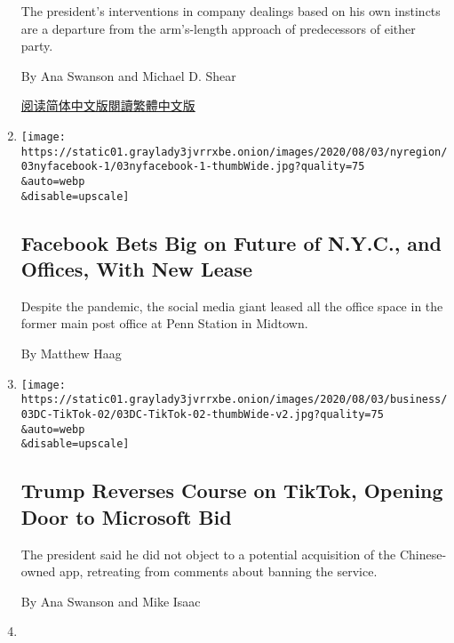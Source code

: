 \begin{enumerate}
  The president's interventions in company dealings based on his own
  instincts are a departure from the arm's-length approach of
  predecessors of either party.

  By Ana Swanson and Michael D. Shear

  \href{https://cn.nytimes3xbfgragh.onion/business/20200804/trump-tiktok-china-business/}{阅读简体中文版}\href{https://cn.nytimes3xbfgragh.onion/business/20200804/trump-tiktok-china-business/zh-hant/}{閱讀繁體中文版}
\item
  \href{/2020/08/03/nyregion/facebook-nyc-office-farley-building.html}{}

  \texttt{[image: https://static01.graylady3jvrrxbe.onion/images/2020/08/03/nyregion/03nyfacebook-1/03nyfacebook-1-thumbWide.jpg?quality=75\\\&auto=webp\\\&disable=upscale]}

  \hypertarget{facebook-bets-big-on-future-of-nyc-and-offices-with-new-lease}{%
  \subsection{Facebook Bets Big on Future of N.Y.C., and Offices, With
  New
  Lease}\label{facebook-bets-big-on-future-of-nyc-and-offices-with-new-lease}}

  Despite the pandemic, the social media giant leased all the office
  space in the former main post office at Penn Station in Midtown.

  By Matthew Haag
\item
  \href{/2020/08/03/technology/trump-tiktok-microsoft.html}{}

  \texttt{[image: https://static01.graylady3jvrrxbe.onion/images/2020/08/03/business/03DC-TikTok-02/03DC-TikTok-02-thumbWide-v2.jpg?quality=75\\\&auto=webp\\\&disable=upscale]}

  \hypertarget{trump-reverses-course-on-tiktok-opening-door-to-microsoft-bid}{%
  \subsection{Trump Reverses Course on TikTok, Opening Door to Microsoft
  Bid}\label{trump-reverses-course-on-tiktok-opening-door-to-microsoft-bid}}

  The president said he did not object to a potential acquisition of the
  Chinese-owned app, retreating from comments about banning the service.

  By Ana Swanson and Mike Isaac
\item
  \href{/2020/08/03/technology/tiktok-microsoft.html}{}


\end{enumerate}
